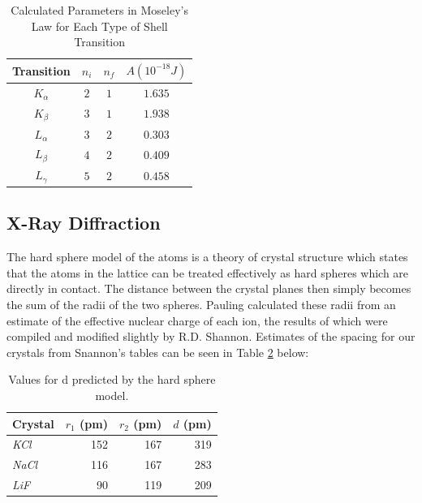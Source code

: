 \documentclass[%
 reprint,
 amsmath,amssymb,
 aps,
 pra,
]{revtex4-1}
\begin{document}
\begin{table}[htbp]
	\begin{center}
		\begin{tabular}{|c|c|c|c|}
			\hline Transition & $n_{i}$  & $n_{f}$ & $A (10^{-18} J)$ \\
			\hline $K_{\alpha}$ & $2$ & $1$ & $1.635$ \\
			\hline $K_{\beta}$ & $3$ & $1$ & $1.938$ \\
			\hline $L_{\alpha}$ & $3$ & $2$ & $0.303$ \\
			\hline $L_{\beta}$ & $4$ & $2$ & $0.409$ \\
			\hline $L_{\gamma}$ & $5$ & $2$ & $0.458$ \\
			\hline
		\end{tabular}
	\end{center}
	\caption{Calculated Parameters in Moseley's Law for Each Type of Shell Transition}
	\label{Tab:RydParam}
\end{table}



\subsection{X-Ray Diffraction}

The hard sphere model of the atoms is a theory of crystal structure which states that the atoms in the lattice can be treated effectively as hard spheres which are directly in contact. The distance between the crystal planes then simply becomes the sum of the radii of the two spheres. Pauling calculated these radii from an estimate of the effective nuclear charge of each ion\cite{hard_sphere2}, the results of which were compiled and modified slightly by R.D. Shannon\cite{hard_sphere}. Estimates of the spacing for our crystals from Snannon's tables can be seen in Table \ref{table:hardsphere_d} below:

\begin{table}[htbp]
	\begin{center}
	\begin{tabular}{|l|r|r|r|}
		\hline
		\textbf{Crystal} & \multicolumn{1}{l|}{\textbf{$r_1$ (pm)}} & \multicolumn{1}{l|}{\textbf{$r_2$ (pm)}} & \multicolumn{1}{l|}{\textbf{$d$ (pm)}} \\ \hline
		\textit{KCl } & 152 & 167 & 319 \\ \hline
		\textit{NaCl} & 116 & 167 & 283 \\ \hline
		\textit{LiF} & 90 & 119 & 209 \\ \hline
	\end{tabular}
	\end{center}
	\caption{Values for d predicted by the hard sphere model\cite{hard_sphere}.}
	\label{table:hardsphere_d}
\end{table}
\end{document}
